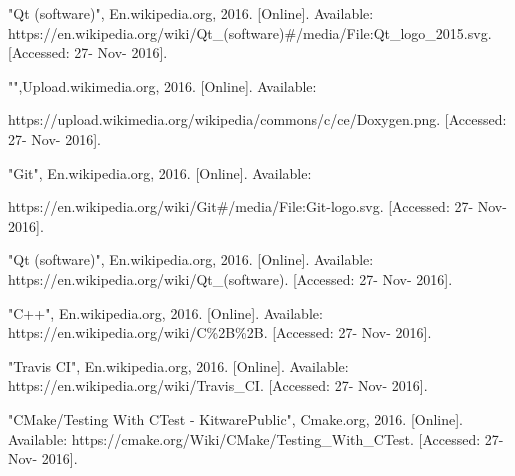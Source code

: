 \begin{thebibliography}{22}
\bibitem{} "Qt (software)", En.wikipedia.org, 2016. [Online]. Available: https://en.wikipedia.org/wiki/Qt\_(software)\#/media/File:Qt\_logo\_2015.svg. [Accessed: 27- Nov- 2016].


\bibitem{} "",Upload.wikimedia.org, 2016. [Online]. Available: 

https://upload.wikimedia.org/wikipedia/commons/c/ce/Doxygen.png. [Accessed: 27- Nov- 2016].


\bibitem{} "Git", En.wikipedia.org, 2016. [Online]. Available: 

https://en.wikipedia.org/wiki/Git\#/media/File:Git-logo.svg. [Accessed: 27- Nov- 2016].


\bibitem{}"Qt (software)", En.wikipedia.org, 2016. [Online]. Available: https://en.wikipedia.org/wiki/Qt\_(software). [Accessed: 27- Nov- 2016].

\bibitem{} "C++", En.wikipedia.org, 2016. [Online]. Available: https://en.wikipedia.org/wiki/C\%2B\%2B. [Accessed: 27- Nov- 2016].

\bibitem{}"Travis CI", En.wikipedia.org, 2016. [Online]. Available: https://en.wikipedia.org/wiki/Travis\_CI. [Accessed: 27- Nov- 2016].

\bibitem{} "CMake/Testing With CTest - KitwarePublic", Cmake.org, 2016. [Online]. Available: https://cmake.org/Wiki/CMake/Testing\_With\_CTest. [Accessed: 27- Nov- 2016].

\end{thebibliography}
